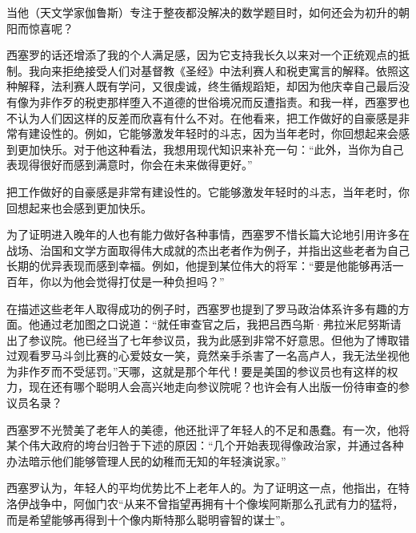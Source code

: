\begin{WisdomBox}
\par

当他（天文学家伽鲁斯）专注于整夜都没解决的数学题目时，如何还会为初升的朝阳而惊喜呢？
\par
\end{WisdomBox}

西塞罗的话还增添了我的个人满足感，因为它支持我长久以来对一个正统观点的抵制。我向来拒绝接受人们对基督教《圣经》中法利赛人和税吏寓言的解释。依照这种解释，法利赛人既有学问，又很虔诚，终生循规蹈矩，却因为他庆幸自己最后没有像为非作歹的税吏那样堕入不道德的世俗境况而反遭指责。和我一样，西塞罗也不认为人们因这样的反差而欣喜有什么不对。在他看来，把工作做好的自豪感是非常有建设性的。例如，它能够激发年轻时的斗志，因为当年老时，你回想起来会感到更加快乐。对于他这种看法，我想用现代知识来补充一句：“此外，当你为自己表现得很好而感到满意时，你会在未来做得更好。”
\par

\begin{WisdomBox}
\par

把工作做好的自豪感是非常有建设性的。它能够激发年轻时的斗志，当年老时，你回想起来也会感到更加快乐。
\par
\end{WisdomBox}

为了证明进入晚年的人也有能力做好各种事情，西塞罗不惜长篇大论地引用许多在战场、治国和文学方面取得伟大成就的杰出老者作为例子，并指出这些老者为自己长期的优异表现而感到幸福。例如，他提到某位伟大的将军：“要是他能够再活一百年，你以为他会觉得打仗是一种负担吗？”
\par

在描述这些老年人取得成功的例子时，西塞罗也提到了罗马政治体系许多有趣的方面。他通过老加图之口说道：“就任审查官之后，我把吕西乌斯·弗拉米尼努斯请出了参议院。他已经当了七年参议员，我为此感到非常不好意思。但他为了博取错过观看罗马斗剑比赛的心爱妓女一笑，竟然亲手杀害了一名高卢人，我无法坐视他为非作歹而不受惩罚。”天哪，这就是那个年代！要是美国的参议员也有这样的权力，现在还有哪个聪明人会高兴地走向参议院呢？也许会有人出版一份待审查的参议员名录？
\par

西塞罗不光赞美了老年人的美德，他还批评了年轻人的不足和愚蠢。有一次，他将某个伟大政府的垮台归咎于下述的原因：“几个开始表现得像政治家，并通过各种办法暗示他们能够管理人民的幼稚而无知的年轻演说家。”
\par

西塞罗认为，年轻人的平均优势比不上老年人的。为了证明这一点，他指出，在特洛伊战争中，阿伽门农“从来不曾指望再拥有十个像埃阿斯那么孔武有力的猛将，而是希望能够再得到十个像内斯特那么聪明睿智的谋士”。
\par

